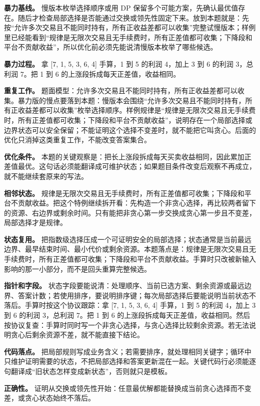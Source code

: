 \textbf{暴力基线。} 慢版本枚举选择顺序或用 DP 保留多个可能方案，先确认最优值存在。随后才检查局部选择是否能通过交换或领先性固定下来。放到本题就是：先按“允许多次交易且不能同时持有，所有正收益差都可以收集”完整试慢版本；样例里已经能看到“规律是无限次交易且无手续费时，所有正差值都可收集；下降段和平台不贡献收益”，所以优化前必须先能说清慢版本枚举了哪些候选。

\textbf{暴力过程。} 拿 [7, 1, 5, 3, 6, 4] 手算，1 到 5 的利润 4，加上 3 到 6 的利润 3，总利润 7。把 1 到 6 的上涨段拆成每天正差值，收益相同。

\textbf{重复工作。} 题面模型：允许多次交易且不能同时持有，所有正收益差都可以收集。暴力版的慢点要落到本题：慢版本会围绕“允许多次交易且不能同时持有，所有正收益差都可以收集”枚举选择顺序。样例规律是“规律是无限次交易且无手续费时，所有正差值都可收集；下降段和平台不贡献收益”，说明存在一个局部选择或边界状态可以安全保留；不能证明这个选择不变差时，就不能把它叫贪心。后面的优化只消掉这类重复工作，不能改变答案集合。

\textbf{优化条件。} 本题的关键观察是：把长上涨段拆成每天买卖收益相同，因此累加正差值最优。这句话必须能翻译成可维护状态；如果题目条件改变后观察不再成立，就不能继续套原来的写法。

\textbf{相邻状态。} 规律是无限次交易且无手续费时，所有正差值都可收集；下降段和平台不贡献收益。把这个特例继续拆开看：先构造一个非贪心选择，再比较两者留下的资源、右边界或剩余时间。只有能把非贪心第一步交换成贪心第一步且不变差，局部选择才是规律。

\textbf{状态复用。} 把指数级选择压成一个可证明安全的局部选择；状态通常是当前最远边界、最早结束时间、最小代价或剩余资源。本题落点是：规律是无限次交易且无手续费时，所有正差值都可收集；下降段和平台不贡献收益。手算时只改被新输入影响的那一小部分，而不是回头重算完整候选。

\textbf{指针和字段。} 状态字段要能说清：处理顺序、当前已选方案、剩余资源或最远边界、答案计数；若使用排序，要说明排序键；每次局部选择后要能说明当前状态不落后。手算时按这个协议跟踪：拿 [7, 1, 5, 3, 6, 4] 手算，1 到 5 的利润 4，加上 3 到 6 的利润 3，总利润 7。把 1 到 6 的上涨段拆成每天正差值，收益相同。然后按协议复查：手算时同时写一个非贪心选择，与贪心选择比较剩余资源。若无法说明贪心后剩余资源不差，就不能直接下结论。

\textbf{代码落点。} 把局部规则写成业务含义；若需要排序，就处理相同关键字；循环中只维护证明需要的状态，不把局部选择和答案更新混在一起。关键代码行必须能逐句翻译成“旧状态怎样变成新状态”，否则就只是模板。

\textbf{正确性。} 证明从交换或领先性开始：任意最优解都能替换成当前贪心选择而不变差，或贪心状态始终不落后。

